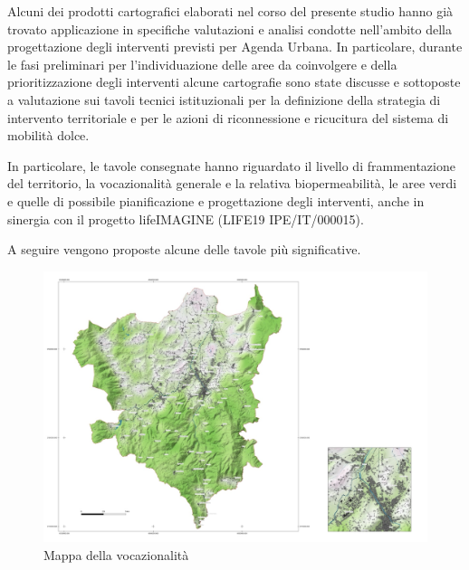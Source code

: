 \documentclass[
  a4paper,
]{book}
\begin{document}
Alcuni dei prodotti cartografici elaborati nel corso del presente studio hanno già trovato applicazione in specifiche valutazioni e analisi condotte nell'ambito della progettazione degli interventi previsti per Agenda Urbana.
In particolare, durante le fasi preliminari per l'individuazione delle aree da coinvolgere e della prioritizzazione degli interventi alcune cartografie sono state discusse e sottoposte a valutazione sui tavoli tecnici istituzionali per la definizione della strategia di intervento territoriale e per le azioni di riconnessione e ricucitura del sistema di mobilità dolce.

In particolare, le tavole consegnate hanno riguardato il livello di frammentazione del territorio, la vocazionalità generale e la relativa biopermeabilità, le aree verdi e quelle di possibile pianificazione e progettazione degli interventi, anche in sinergia con il progetto lifeIMAGINE (LIFE19 IPE/IT/000015).

A seguire vengono proposte alcune delle tavole più significative.

\begin{figure}

{\centering \includegraphics[width=\linewidth]{./figs/agendaUrbana/mappaSuitability20240619} 

}

\caption{Mappa della vocazionalità}\label{fig:agUsuit}
\end{figure}
\end{document}
